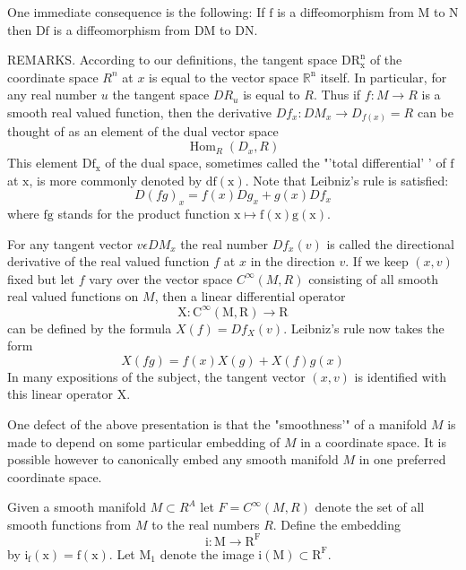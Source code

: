 \documentclass[10pt]{article}
\begin{document}
One immediate consequence is the following: If $\mathrm{f}$ is a diffeomorphism from $\mathrm{M}$ to $\mathrm{N}$ then $\mathrm{Df}$ is a diffeomorphism from $\mathrm{DM}$ to $\mathrm{DN}$.

REMARKS. According to our definitions, the tangent space $\mathrm{DR}_{\mathrm{x}}^{\mathrm{n}}$ of the coordinate space $R^{n}$ at $x$ is equal to the vector space $\mathbb{R}^{\mathrm{n}}$ itself. In particular, for any real number $u$ the tangent space $D R_{u}$ is equal to $R$. Thus if $f: M \rightarrow R$ is a smooth real valued function, then the derivative $D f_{x}: D M_{x} \rightarrow D_{f(x)}=R$ can be thought of as an element of the dual vector space
$$
\operatorname{Hom}_{R}\left(D_{x}, R\right)
$$
This element $\mathrm{Df}_{\mathrm{x}}$ of the dual space, sometimes called the "'total differential' ' of $\mathrm{f}$ at $\mathrm{x}$, is more commonly denoted by $\mathrm{df}(\mathrm{x})$. Note that Leibniz's rule is satisfied:
$$
D(f g)_{x}=f(x) D g_{x}+g(x) D f_{x}
$$
where $\mathrm{fg}$ stands for the product function $\mathrm{x} \mapsto \mathrm{f}(\mathrm{x}) \mathrm{g}(\mathrm{x})$.

For any tangent vector $v \epsilon D M_{x}$ the real number $D f_{x}(v)$ is called the directional derivative of the real valued function $f$ at $x$ in the direction $v$. If we keep $(x, v)$ fixed but let $f$ vary over the vector space $C^{\infty}(M, R)$ consisting of all smooth real valued functions on $M$, then a linear differential operator
$$
\mathrm{X}: \mathrm{C}^{\infty}(\mathrm{M}, \mathrm{R}) \rightarrow \mathrm{R}
$$
can be defined by the formula $X(f)=D f_{X}(v)$. Leibniz's rule now takes the form
$$
X(f g)=f(x) X(g)+X(f) g(x)
$$
In many expositions of the subject, the tangent vector $(x, v)$ is identified with this linear operator $\mathrm{X}$.

One defect of the above presentation is that the "smoothness'" of a manifold $M$ is made to depend on some particular embedding of $M$ in a coordinate space. It is possible however to canonically embed any smooth manifold $M$ in one preferred coordinate space.

Given a smooth manifold $M \subset R^{A}$ let $F=C^{\infty}(M, R)$ denote the set of all smooth functions from $M$ to the real numbers $R$. Define the embedding
$$
\mathrm{i}: \mathrm{M} \rightarrow \mathrm{R}^{\mathrm{F}}
$$
by $\mathrm{i}_{\mathrm{f}}(\mathrm{x})=\mathrm{f}(\mathrm{x})$. Let $\mathrm{M}_{1}$ denote the image $\mathrm{i}(\mathrm{M}) \subset \mathrm{R}^{\mathrm{F}}$.
\end{document}
